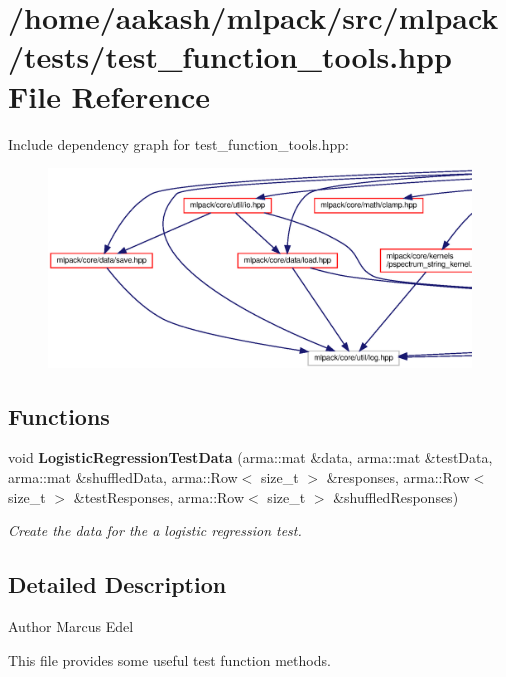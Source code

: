 \section{/home/aakash/mlpack/src/mlpack/tests/test\+\_\+function\+\_\+tools.hpp File Reference}
\label{test__function__tools_8hpp}
Include dependency graph for test\+\_\+function\+\_\+tools.\+hpp\+:
\nopagebreak
\begin{figure}[H]
\begin{center}
\leavevmode
\includegraphics[width=350pt]{test__function__tools_8hpp__incl}
\end{center}
\end{figure}
\subsection*{Functions}
\begin{DoxyCompactItemize}
\item 
void \textbf{ Logistic\+Regression\+Test\+Data} (arma\+::mat \&data, arma\+::mat \&test\+Data, arma\+::mat \&shuffled\+Data, arma\+::\+Row$<$ size\+\_\+t $>$ \&responses, arma\+::\+Row$<$ size\+\_\+t $>$ \&test\+Responses, arma\+::\+Row$<$ size\+\_\+t $>$ \&shuffled\+Responses)
\begin{DoxyCompactList}\small\item\em Create the data for the a logistic regression test. \end{DoxyCompactList}\end{DoxyCompactItemize}


\subsection{Detailed Description}
\begin{DoxyAuthor}{Author}
Marcus Edel
\end{DoxyAuthor}
This file provides some useful test function methods.

